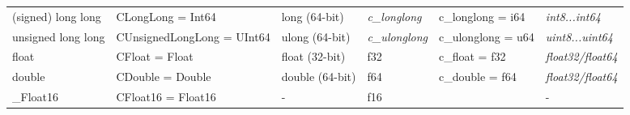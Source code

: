 \begin{table}[tbp]
\begin{adjustwidth}{-2.5cm}{}
\begin{tabular}{
>{\columncolor[HTML]{D9D9D9}}l lllll}
(signed) long long                                                        & CLongLong = Int64                                                       &    long  (64-bit)                                                                        & \cellcolor[HTML]{CFE2F3}\textit{c\_longlong}                                 & c\_longlong = i64                                                                                                                                                    & \cellcolor[HTML]{CFE2F3}\textit{int8...int64}                         \\
unsigned long long                                                        & CUnsignedLongLong = UInt64                                              &    ulong (64-bit)                                                                               & \cellcolor[HTML]{CFE2F3}\textit{c\_ulonglong}                                & c\_ulonglong = u64                                                                                                                                                   & \cellcolor[HTML]{CFE2F3}\textit{uint8...uint64}                       \\
float                                                                     & CFloat = Float                                                          &    float (32-bit)                                                                                    & f32                                                                 & c\_float = f32                                                                                                                                                                & \cellcolor[HTML]{CFE2F3}\textit{float32/float64}                      \\
double                                                                    & CDouble = Double                                                        &    double (64-bit)                                                                       & f64                                                                 & c\_double = f64                                                                                                                                                               & \cellcolor[HTML]{CFE2F3}\textit{float32/float64}                      \\
\_Float16                                                                 & CFloat16 = Float16                                                      & \cellcolor[HTML]{F4CCCC}-                                                                                    & f16                                                                 & \cellcolor[HTML]{F4CCCC}{\href{https://doc.rust-lang.org/std/primitive.f16.html}{f16 (Exp.)}}                                                                                 & \cellcolor[HTML]{F4CCCC}-                                               \\

\end{tabular}
\end{adjustwidth}
\end{table}

